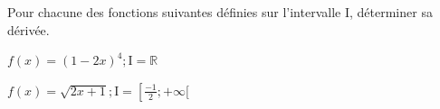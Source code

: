 \documentclass[12pt,a4paper]{article}  %
\begin{document}
\exercice{}

Pour chacune des fonctions suivantes définies sur l'intervalle I, déterminer sa dérivée.
\begin{enumMet}
	\item $f(x)=(1-2 x)^4 ; \mathrm{I}=\mathbb{R}$
	\item $f(x)=\sqrt{2 x+1} ; \mathrm{I}=\left[\frac{-1}{2} ;+\infty[\right.$
\end{enumMet}

%
%
%
%
%
\end{document}
